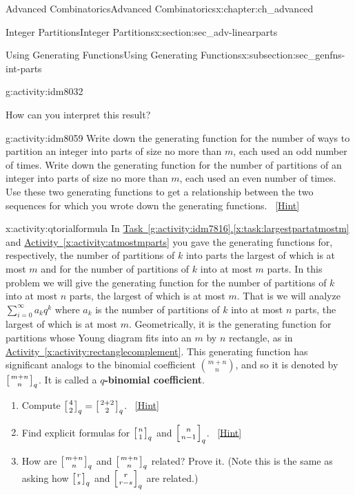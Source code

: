 \documentclass[oneside,10pt,]{book}
\newcommand{\terminology}[1]{\textbf{#1}}
\numberwithin{equation}{chapter}
\newcommand{\qchoose}[2]{\left[{#1\atop#2}\right]_q}
\begin{document}
\begin{chapterptx}{Advanced Combinatorics}{}{Advanced Combinatorics}{}{}{x:chapter:ch_advanced}
\begin{sectionptx}{Integer Partitions}{}{Integer Partitions}{}{}{x:section:sec_adv-linearparts}
\begin{subsectionptx}{Using Generating Functions}{}{Using Generating Functions}{}{}{x:subsection:sec_genfns-int-parts}
\begin{activity}{}{g:activity:idm8032}
\begin{enumerate}[font=\bfseries,label=(\alph*),ref=\alph*]
\begin{equation*}
\end{equation*}
How can you interpret this result?%
\end{enumerate}
\end{activity}
\begin{activity}{}{g:activity:idm8059}%
Write down the generating function for the number of ways to partition an integer into parts of size no more than \(m\), each used an odd number of times. Write down the generating function for the number of partitions of an integer into parts of size no more than \(m\), each used an even number of times. Use these two generating functions to get a relationship between the two sequences for which you wrote down the generating functions.%
\qquad~\hfill{\tiny\hyperlink{g:hint:idm8064-back}{[Hint]}}\end{activity}
\begin{activity}{}{x:activity:qtorialformula}%
In \hyperref[x:task:largestpartatmostm]{Task~\ref{g:activity:idm7816}.\ref{x:task:largestpartatmostm}} and \hyperref[x:activity:atmostmparts]{Activity~\ref{x:activity:atmostmparts}} you gave the generating functions for, respectively, the number of partitions of \(k\) into parts the largest of which is at most \(m\) and for the number of partitions of \(k\) into at most \(m\) parts. In this problem we will give the generating function for the number of partitions of \(k\) into at most \(n\) parts, the largest of which is at most \(m\). That is we will analyze \(\sum_{i=0}^\infty a_kq^k\) where \(a_k\) is the number of partitions of \(k\) into at most \(n\) parts, the largest of which is at most \(m\). Geometrically, it is the generating function for partitions whose Young diagram fits into an \(m\) by \(n\) rectangle, as in \hyperref[x:activity:rectanglecomplement]{Activity~\ref{x:activity:rectanglecomplement}}. This generating function has significant analogs to the binomial coefficient \(\binom{m+n}{n}\), and so it is denoted by \(\qchoose{m+n}{n}\). It is called a \terminology{\(q\)-binomial coefficient}.%
\begin{enumerate}[font=\bfseries,label=(\alph*),ref=\alph*]
\item{}Compute \(\qchoose{4}{2}=\qchoose{2+2}{2}\).%
\qquad~\hfill{\tiny\hyperlink{g:hint:idm8112-back}{[Hint]}}\item{}Find explicit formulas for \(\qchoose{n}{1}\) and \(\qchoose{n}{n-1}\).%
\qquad~\hfill{\tiny\hyperlink{g:hint:idm8122-back}{[Hint]}}\item{}How are \(\qchoose{m+n}{n}\) and \(\qchoose{m+n}{n}\) related? Prove it. (Note this is the same as asking how \(\qchoose{r}{s}\) and \(\qchoose{r}{r-s}\) are related.)%

\end{enumerate}
\end{activity}
\end{subsectionptx}
\end{sectionptx}
\end{chapterptx}
\end{document}
